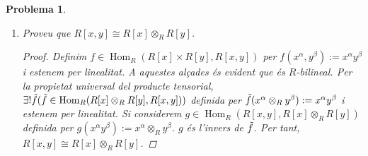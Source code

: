 \documentclass[compress]{article}
\newtheorem{problema}{Problema}
\theoremstyle{definition}
\DeclareMathOperator{\Hom}{Hom}
\begin{document}
\begin{problema}
\begin{enumerate}
\begin{proof}
\begin{align*}
                f(g(r+(I+J)))
                &=f((r+I)\otimes_{R}(1_{R}+J))
                &\quad&\textrm{(Per definició de $g$)}\\
                &=r1_{R}+(I+J)
                &\quad&\textrm{(Per definició de $f$)}\\
                &=R+(I+J)
            \end{align*}
            i
            \begin{align*}
                g(f((r+I)\otimes_{R}(r'+J)))
                &=g(rr'+(I+J))
                &\quad&\textrm{(Per definició de $f$)}\\
                &=(rr'+I)\otimes_{R}(1_{R}+J)
                &\quad&\textrm{(Per definició de $g$)}\\
                &=r'((r+I)\otimes_{R}(1_{R}+J))\\
                &=(r+I)\otimes_{R}(r'1_{R}+J)\\
                &=(r+I)\otimes_{R}(r'+J)
            \end{align*}
            d'on deduïm que $R/I\otimes_{R}R/J\cong R/(I + J)$.
        \end{proof}
        \item Proveu que $R[x,y]\cong R[x]\otimes_{R}R[y]$.
        \begin{proof}
            Definim $f\in\Hom_{R}(R[x]\times R[y],R[x,y])$ per $f(x^{\alpha},y^{\beta}):=x^{\alpha}y^{\beta}$ i estenem per linealitat. A aquestes alçades és evident que és $R$-bilineal. Per la propietat universal del producte tensorial, $\exists!\Tilde{f}(\Tilde{f}\in\Hom_{R}(R[x]\otimes_{R}R[y],R[x,y]))$ definida per $\Tilde{f}(x^{\alpha}\otimes_{R}y^{\beta}):=x^{\alpha}y^{\beta}$ i estenem per linealitat. Si considerem $g\in\Hom_{R}(R[x,y],R[x]\otimes_{R}R[y])$ definida per $g(x^{\alpha}y^{\beta}):=x^{\alpha}\otimes_{R}y^{\beta}$. $g$ és l'invers de $\Tilde{f}$. Per tant, $R[x,y]\cong R[x]\otimes_{R}R[y]$.
        \end{proof}
    \end{enumerate}
\end{problema}
\end{document}

